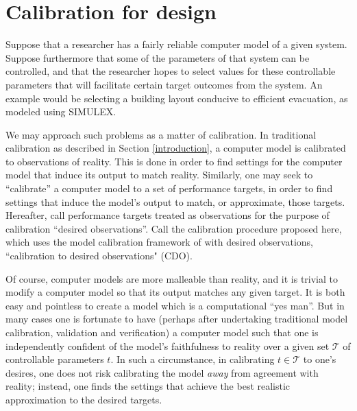 \documentclass{article}
\begin{document}
\section{Calibration for design}\label{calib_for_design}


Suppose that a researcher has a fairly reliable computer model of a given system. Suppose furthermore that some of the parameters of that system can be controlled, and that the researcher hopes to select values for these controllable parameters that will facilitate certain target outcomes from the system. An example would be selecting a building layout conducive to efficient evacuation, as modeled using SIMULEX.

We may approach such problems as a matter of calibration. In traditional calibration as described in Section \ref{introduction}, a computer model is calibrated to observations of reality. This is done in order to find settings for the computer model that induce its output to match reality. Similarly, one may seek to ``calibrate'' a computer model to a set of performance targets, in order to find settings that induce the model's output to match, or approximate, those targets. Hereafter, call performance targets treated as observations for the purpose of calibration ``desired observations''. Call the calibration procedure proposed here, which uses the model calibration framework of \cite{Kennedy2001} with desired observations, ``calibration to desired observations" (CDO). 

Of course, computer models are more malleable than reality, and it is trivial to modify a computer model so that its output matches any given target. It is both easy and pointless to create a model which is a computational ``yes man''. But in many cases one is fortunate to have (perhaps after undertaking traditional model calibration, validation and verification) a computer model such that one is independently confident of the model's faithfulness to reality over a given set $\mathcal T$ of controllable parameters $t$. In such a circumstance, in calibrating $t\in\mathcal T$ to one's desires, one does not risk calibrating the model \emph{away} from agreement with reality; instead, one finds the settings that achieve the best realistic approximation to the desired targets.
\end{document}
